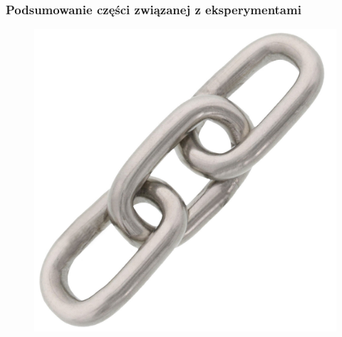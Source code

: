 \begin{frame}
    \frametitle{Podsumowanie części związanej z eksperymentami}
    \begin{figure}[H]
    \includegraphics[scale=0.13]{img/chain.jpg} 
    \end{figure}
\end{frame}